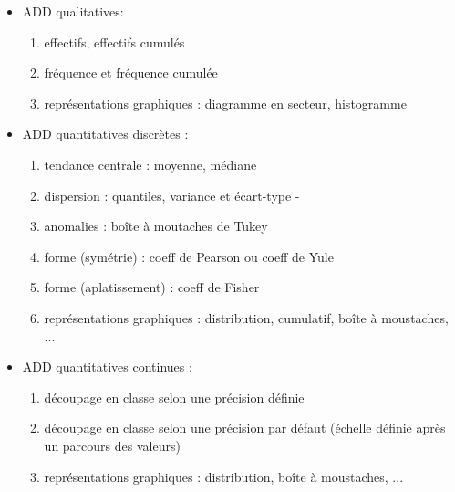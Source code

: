 \begin{itemize}
			\item ADD qualitatives:\\
					\begin{enumerate}
					\item effectifs, effectifs cumulés
					\item fréquence et fréquence cumulée
					\item représentations graphiques : diagramme en secteur, histogramme
					\end{enumerate}
			\item ADD quantitatives discrètes :\\
					\begin{enumerate}
					\item tendance centrale : moyenne, médiane
					\item dispersion : quantiles, variance et écart-type
-					\item anomalies : boîte à moutaches de Tukey
					\item forme (symétrie) : coeff de Pearson ou coeff de Yule
					\item forme (aplatissement) : coeff de Fisher
					\item représentations graphiques : distribution, cumulatif,  boîte à moustaches, ...
					\end{enumerate}
			\item ADD quantitatives continues :\\
					\begin{enumerate}
					\item découpage en classe selon une précision définie
					\item découpage en classe selon une précision par défaut (échelle définie après un parcours des valeurs)
					\item représentations graphiques : distribution, boîte à moustaches, ...
					\end{enumerate}
					

\end{itemize}
